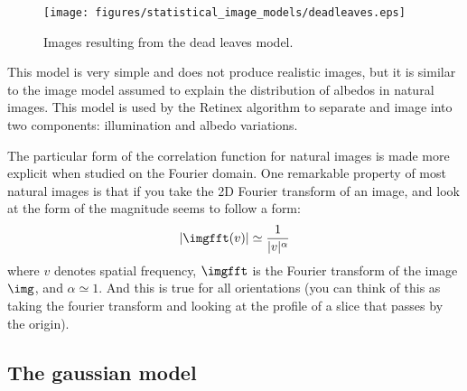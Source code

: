 \begin{figure}[htpb]
\centerline{
\texttt{[image: figures/statistical\_image\_models/deadleaves.eps]}
} 
\caption{Images resulting from the dead leaves model.
} 
\label{fig:deadleaves}
\end{figure}

This model is very simple and does not produce realistic images, but it is similar to the image model assumed to explain the distribution of albedos in natural images. This model is used by the Retinex algorithm to separate and image into two components: illumination and albedo variations. %

The particular form of the correlation function for natural images is made more explicit when studied on the Fourier domain. One remarkable property of most natural images is that if you take the 2D Fourier transform of an image, and look at the form of the magnitude seems to follow a form:
\begin{equation}
| \imgfft(v) | \simeq \frac{1}{| v | ^ \alpha}
\end{equation}
where $v$ denotes spatial frequency, $\imgfft$ is the Fourier transform of the image $\img$, and $\alpha \simeq 1$. And this is true for all orientations (you can think of this as taking the fourier transform and looking at the profile of a slice that passes by the origin). 



\subsection{The gaussian model}

